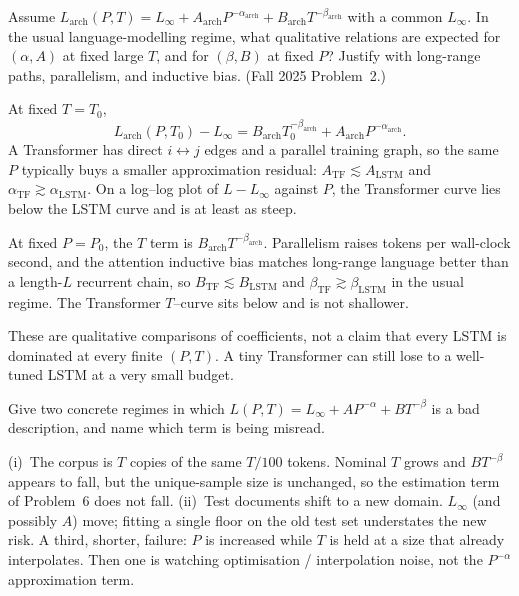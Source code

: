 \begin{exercise}
\label{ex:nlpu-lstm-tf-scale}
Assume $L_{\mathrm{arch}}(P,T)=L_\infty+A_{\mathrm{arch}}P^{-\alpha_{\mathrm{arch}}}+B_{\mathrm{arch}}T^{-\beta_{\mathrm{arch}}}$ with a common $L_\infty$. In the usual language-modelling regime, what qualitative relations are expected for $(\alpha,A)$ at fixed large $T$, and for $(\beta,B)$ at fixed $P$? Justify with long-range paths, parallelism, and inductive bias. (Fall 2025 Problem~2.)
\end{exercise}

\begin{solution}
At fixed $T=T_0$,
\[
L_{\mathrm{arch}}(P,T_0)-L_\infty
=
B_{\mathrm{arch}}T_0^{-\beta_{\mathrm{arch}}}
+
A_{\mathrm{arch}}P^{-\alpha_{\mathrm{arch}}}.
\]
A Transformer has direct $i\leftrightarrow j$ edges and a parallel training graph, so the same $P$ typically buys a smaller approximation residual: $A_{\mathrm{TF}}\lesssim A_{\mathrm{LSTM}}$ and $\alpha_{\mathrm{TF}}\gtrsim\alpha_{\mathrm{LSTM}}$. On a log--log plot of $L-L_\infty$ against $P$, the Transformer curve lies below the LSTM curve and is at least as steep.

At fixed $P=P_0$, the $T$ term is $B_{\mathrm{arch}}T^{-\beta_{\mathrm{arch}}}$. Parallelism raises tokens per wall-clock second, and the attention inductive bias matches long-range language better than a length-$L$ recurrent chain, so $B_{\mathrm{TF}}\lesssim B_{\mathrm{LSTM}}$ and $\beta_{\mathrm{TF}}\gtrsim\beta_{\mathrm{LSTM}}$ in the usual regime. The Transformer $T$--curve sits below and is not shallower.

These are qualitative comparisons of coefficients, not a claim that every LSTM is dominated at every finite $(P,T)$. A tiny Transformer can still lose to a well-tuned LSTM at a very small budget.
\end{solution}

\begin{exercise}
\label{ex:nlpu-scale-break}
Give two concrete regimes in which $L(P,T)=L_\infty+AP^{-\alpha}+BT^{-\beta}$ is a bad description, and name which term is being misread.
\end{exercise}

\begin{solution}
(i)~The corpus is $T$ copies of the same $T/100$ tokens. Nominal $T$ grows and $BT^{-\beta}$ appears to fall, but the unique-sample size is unchanged, so the estimation term of Problem~6 does not fall. (ii)~Test documents shift to a new domain. $L_\infty$ (and possibly $A$) move; fitting a single floor on the old test set understates the new risk. A third, shorter, failure: $P$ is increased while $T$ is held at a size that already interpolates. Then one is watching optimisation / interpolation noise, not the $P^{-\alpha}$ approximation term.
\end{solution}


